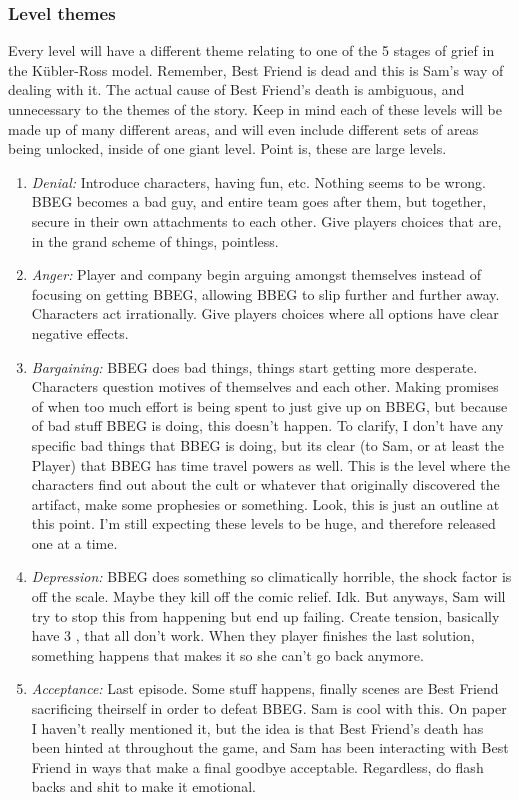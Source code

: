 \documentclass[a4paper,12pt]{article}
\begin{document}
  \subsubsection*{Level themes}
  Every level will have a different theme relating to one of the 5 stages of grief in the K\"ubler-Ross model. Remember, Best Friend is dead and this is Sam's way of dealing with it. The actual cause of Best Friend's death is ambiguous, and unnecessary to the themes of the story. Keep in mind each of these levels will be made up of many different areas, and will even include different sets of areas being unlocked, inside of one giant level. Point is, these are large levels.
  \begin{enumerate}[1.]
    \item \emph{Denial:} Introduce characters, having fun, etc. Nothing seems to be wrong. BBEG becomes a bad guy, and entire team goes after them, but together, secure in their own attachments to each other. Give players choices that are, in the grand scheme of things, pointless. 
    \item \emph{Anger:} Player and company begin arguing amongst themselves instead of focusing on getting BBEG, allowing BBEG to slip further and further away. Characters act irrationally. Give players choices where all options have clear negative effects.
    \item \emph{Bargaining:} BBEG does bad things, things start getting more desperate. Characters question motives of themselves and each other. Making promises of when too much effort is being spent to just give up on BBEG, but because of bad stuff BBEG is doing, this doesn't happen. To clarify, I don't have any specific bad things that BBEG is doing, but its clear (to Sam, or at least the Player) that BBEG has time travel powers as well. This is the level where the characters find out about the cult or whatever that originally discovered the artifact, make some prophesies or something. Look, this is just an outline at this point. I'm still expecting these levels to be huge, and therefore released one at a time.
    \item \emph{Depression:} BBEG does something so climatically horrible, the shock factor is off the scale. Maybe they kill off the comic relief. Idk. But anyways, Sam will try to stop this from happening but end up failing. Create tension, basically have 3 , that all don't work. When they player finishes the last solution, something happens that makes it so she can't go back anymore.
    \item \emph{Acceptance:} Last episode. Some stuff happens, finally scenes are Best Friend sacrificing theirself in order to defeat BBEG. Sam is cool with this. On paper I haven't really mentioned it, but the idea is that Best Friend's death has been hinted at throughout the game, and Sam has been interacting with Best Friend in ways that make a final goodbye acceptable. Regardless, do flash backs and shit to make it emotional.
  \end{enumerate}
\end{document}

